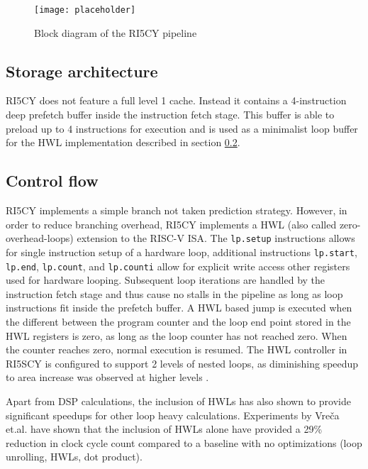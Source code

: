 \documentclass[../bachelor_paper.tex]{subfiles}
\begin{document}
\begin{figure}
    \centering
    \texttt{[image: placeholder]}
    \caption{Block diagram of the RI5CY pipeline}
    \label{fig:plat/base/blockdia}
\end{figure}

\subsection{Storage architecture}
RI5CY does not feature a full level 1 cache. Instead it contains a 4-instruction deep prefetch buffer inside the instruction fetch stage. This buffer is able to preload up to 4 instructions for execution and is used as a minimalist loop buffer for the \ac{HWL} implementation described in section \ref{sub:plat/ip/ctrl}.

\subsection{Control flow}
    \label{sub:plat/ip/ctrl}
RI5CY implements a simple branch not taken prediction strategy. However, in order to reduce branching overhead, RI5CY implements a \acl{HWL} (also called zero-overhead-loops) extension to the RISC-V \ac{ISA}. The \texttt{lp.setup} instructions allows for single instruction setup of a hardware loop, additional instructions \texttt{lp.start}, \texttt{lp.end}, \texttt{lp.count}, and \texttt{lp.counti} allow for explicit write access other registers used for hardware looping. Subsequent loop iterations are handled by the instruction fetch stage and thus cause no stalls in the pipeline as long as loop instructions fit inside the prefetch buffer. A \ac{HWL} based jump is executed when the different between the program counter and the loop end point stored in the \ac{HWL} registers is zero, as long as the loop counter has not reached zero. When the counter reaches zero, normal execution is resumed. The \ac{HWL} controller in RI5SCY is configured to support 2 levels of nested loops, as diminishing speedup to area increase was observed at higher levels \cite{gautschiNearThresholdRISCVCore2017}.

Apart from \ac{DSP} calculations, the inclusion of \acp{HWL} has also shown to provide significant speedups for other loop heavy calculations. Experiments by Vre\v{c}a et.al. \cite{vrecaAcceleratingDeepLearning2020} have shown that the inclusion of \acp{HWL} alone have provided a 29\% reduction in clock cycle count compared to a baseline with no optimizations (loop unrolling, \acp{HWL}, dot product).
\end{document}
